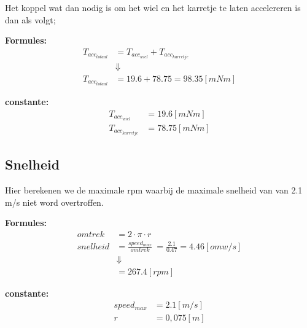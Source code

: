 Het koppel wat dan nodig is om het wiel en het karretje te laten accelereren is dan als volgt;

\begin{multicols}{2}
    \textbf{Formules:}
    \begin{equation}
        \begin{split}
            T_{acc_{totaal}} &= T_{acc_{wiel}} + T_{acc_{karretje}}\\
            &\Downarrow \\
            T_{acc_{totaal}} &= 19.6 + 78.75 = 98.35 [mNm]
        \end{split}
    \end{equation}

    \textbf{constante:}
    \begin{equation*}
        \begin{split}
            T_{acc_{wiel}} &= 19.6 [mNm] \\
            T_{acc_{karretje}} &= 78.75 [mNm] 
        \end{split}
    \end{equation*}
\end{multicols}

\subsection{Snelheid}
    Hier berekenen we de maximale rpm waarbij de maximale snelheid van van 2.1 m/s niet word overtroffen.

    \begin{multicols}{2}
        \textbf{Formules:}
        \begin{equation}
            \begin{split}
                omtrek &= 2 \cdot \pi \cdot r \\
                snelheid &= \frac{speed_{max}}{omtrek}\ = \frac{2.1}{0.47} = 4.46 [omw/s]\\
                &\Downarrow \\
                 &= 267.4 [rpm]
            \end{split}
        \end{equation}

        \textbf{constante:}
        \begin{equation*}
            \begin{split}
                speed_{max} &= 2.1 [m/s]\\
                r &= 0,075 [m] 
            \end{split}
        \end{equation*}
    \end{multicols}

